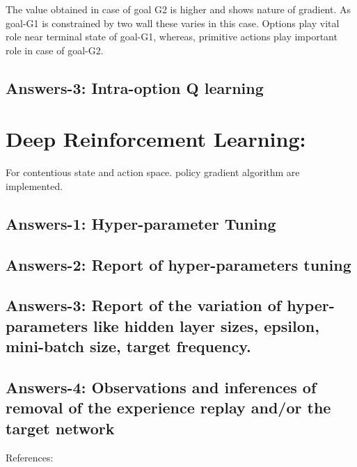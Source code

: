 \documentclass[preprint,12pt]{elsarticle}
\begin{document}
 The value obtained in case of goal G2 is higher and shows nature of gradient. As goal-G1 is constrained by two wall these varies in this case. Options play vital role near terminal state of goal-G1, whereas, primitive actions play important role in case of goal-G2.

\subsection{Answers-3: Intra-option Q learning}

\section{Deep Reinforcement Learning:}
 For contentious state and action space. policy gradient algorithm are implemented. \cite{david}

	
\subsection{Answers-1: Hyper-parameter Tuning}	
\subsection{Answers-2: Report of hyper-parameters tuning}
\subsection{Answers-3: Report of the variation of hyper-parameters like hidden layer sizes, epsilon, mini-batch size, target frequency.}  
\subsection{Answers-4: Observations and inferences of removal of the experience replay and/or the target network}

	\newpage
	
	References:
	\\
	
	
	
	
						
	
	
	
	
	
\end{document}
